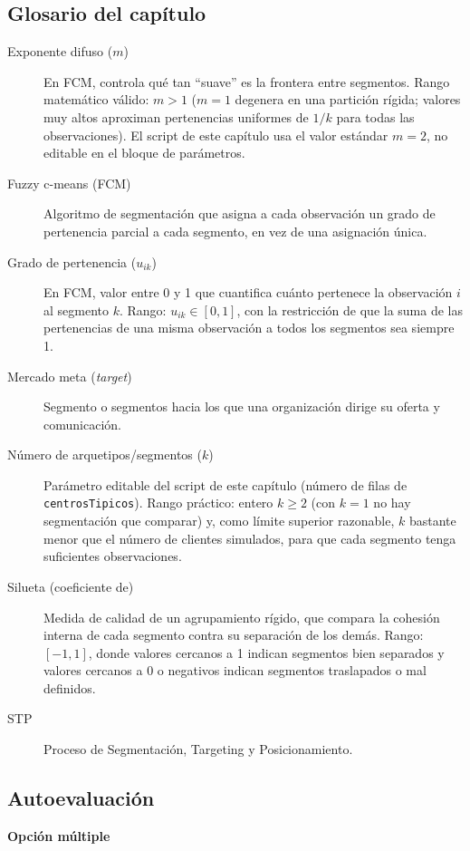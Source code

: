 \subsection*{Glosario del capítulo}
\begin{description}
  \item[Exponente difuso ($m$)] En FCM, controla qué tan \enquote{suave} es la
  frontera entre segmentos. Rango matemático válido: $m > 1$ ($m=1$
  degenera en una partición rígida; valores muy altos aproximan pertenencias
  uniformes de $1/k$ para todas las observaciones). El script de este
  capítulo usa el valor estándar $m=2$, no editable en el bloque de
  parámetros.
  \item[Fuzzy c-means (FCM)] Algoritmo de segmentación que asigna a cada
  observación un grado de pertenencia parcial a cada segmento, en vez de una
  asignación única.
  \item[Grado de pertenencia ($u_{ik}$)] En FCM, valor entre 0 y 1 que
  cuantifica cuánto pertenece la observación $i$ al segmento $k$. Rango:
  $u_{ik} \in [0,1]$, con la restricción de que la suma de las pertenencias
  de una misma observación a todos los segmentos sea siempre 1.
  \item[Mercado meta (\textit{target})] Segmento o segmentos hacia los que
  una organización dirige su oferta y comunicación.
  \item[Número de arquetipos/segmentos ($k$)] Parámetro editable del script
  de este capítulo (número de filas de \texttt{centrosTipicos}). Rango
  práctico: entero $k \geq 2$ (con $k=1$ no hay segmentación que comparar) y,
  como límite superior razonable, $k$ bastante menor que el número de
  clientes simulados, para que cada segmento tenga suficientes observaciones.
  \item[Silueta (coeficiente de)] Medida de calidad de un agrupamiento
  rígido, que compara la cohesión interna de cada segmento contra su
  separación de los demás. Rango: $[-1, 1]$, donde valores cercanos a 1
  indican segmentos bien separados y valores cercanos a 0 o negativos
  indican segmentos traslapados o mal definidos.
  \item[STP] Proceso de Segmentación, Targeting y Posicionamiento.
\end{description}

\subsection*{Autoevaluación}

\textbf{Opción múltiple}

